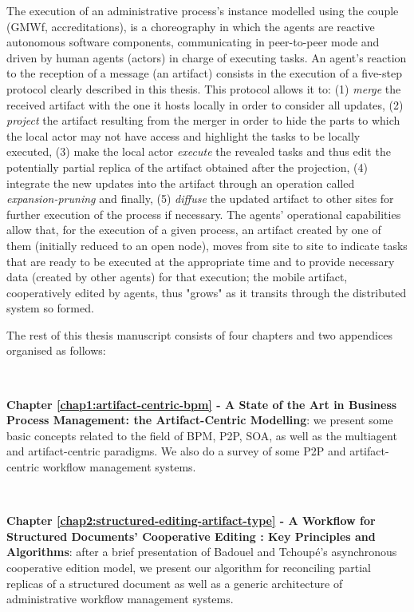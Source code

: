 The execution of an administrative process's instance modelled using the couple (GMWf, accreditations), is a choreography in which the agents are reactive autonomous software components, communicating in peer-to-peer mode and driven by human agents (actors) in charge of executing tasks. An agent's reaction to the reception of a message (an artifact) consists in the execution of a five-step protocol clearly described in this thesis. 
This protocol allows it to: (1) \textit{merge} the received artifact with the one it hosts locally in order to consider all updates, (2) \textit{project} the artifact resulting from the merger in order to hide the parts to which the local actor may not have access and highlight the tasks to be locally executed, (3) make the local actor \textit{execute} the revealed tasks and thus edit the potentially partial replica of the artifact obtained after the projection, (4) integrate the new updates into the artifact through an operation called \textit{expansion-pruning} and finally, (5) \textit{diffuse} the updated artifact to other sites for further execution of the process if necessary. 
The agents' operational capabilities allow that, for the execution of a given process, an artifact created by one of them (initially reduced to an open node), moves from site to site to indicate tasks that are ready to be executed at the appropriate time and to provide necessary data (created by other agents) for that execution; the mobile artifact, cooperatively edited by agents, thus "grows" as it transits through the distributed system so formed.



\label{chap0:sec:manuscript-organisation}
The rest of this thesis manuscript consists of four chapters and two appendices organised as follows:

~

\noindent\textbf{Chapter \ref{chap1:artifact-centric-bpm} - A State of the Art in Business Process Management: the Artifact-Centric Modelling}: we present some basic concepts related to the field of BPM, P2P, SOA, as well as the multiagent and artifact-centric paradigms. We also do a survey of some P2P and artifact-centric workflow management systems.


~

\noindent\textbf{Chapter \ref{chap2:structured-editing-artifact-type} - A Workflow for Structured Documents' Cooperative Editing : Key Principles and Algorithms}: after a brief presentation of Badouel and Tchoup\'e's asynchronous cooperative edition model, we present our algorithm for reconciling partial replicas of a structured document as well as a generic architecture of administrative workflow management systems.


